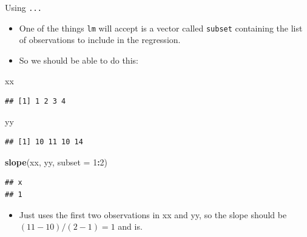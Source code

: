 \documentclass[
  ignorenonframetext,
]{beamer}
\newenvironment{Shaded}{\begin{snugshade}}{\end{snugshade}}
\newcommand{\DataTypeTok}[1]{\textcolor[rgb]{0.13,0.29,0.53}{#1}}
\newcommand{\DecValTok}[1]{\textcolor[rgb]{0.00,0.00,0.81}{#1}}
\newcommand{\KeywordTok}[1]{\textcolor[rgb]{0.13,0.29,0.53}{\textbf{#1}}}
\newcommand{\NormalTok}[1]{#1}
\newcommand{\OperatorTok}[1]{\textcolor[rgb]{0.81,0.36,0.00}{\textbf{#1}}}
\providecommand{\tightlist}{%
  \setlength{\itemsep}{0pt}\setlength{\parskip}{0pt}}
\begin{document}
\begin{frame}[fragile]{Using \texttt{...}}
\protect\hypertarget{using-...}{}

\begin{itemize}
\tightlist
\item
  One of the things \texttt{lm} will accept is a vector called
  \texttt{subset} containing the list of observations to include in the
  regression.
\item
  So we should be able to do this:
\end{itemize}

\begin{Shaded}
\begin{Highlighting}[]
\NormalTok{xx}
\end{Highlighting}
\end{Shaded}

\begin{verbatim}
## [1] 1 2 3 4
\end{verbatim}

\begin{Shaded}
\begin{Highlighting}[]
\NormalTok{yy}
\end{Highlighting}
\end{Shaded}

\begin{verbatim}
## [1] 10 11 10 14
\end{verbatim}

\begin{Shaded}
\begin{Highlighting}[]
\KeywordTok{slope}\NormalTok{(xx, yy, }\DataTypeTok{subset =} \DecValTok{1}\OperatorTok{:}\DecValTok{2}\NormalTok{)}
\end{Highlighting}
\end{Shaded}

\begin{verbatim}
## x 
## 1
\end{verbatim}

\begin{itemize}
\tightlist
\item
  Just uses the first two observations in xx and yy, so the slope should
  be \((11 − 10)/(2 − 1) = 1\) and is.
\end{itemize}

\end{frame}
\end{document}
